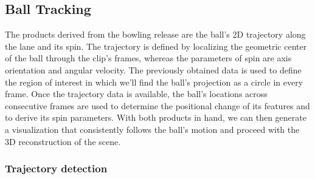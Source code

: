 \subsection{Ball Tracking}

The products derived from the bowling release are the ball’s 2D trajectory along the lane and its spin. The trajectory is defined by localizing the geometric center of the ball through the clip’s frames, whereas the parameters of spin are axis orientation and angular velocity. The previously obtained data is used to define the region of interest in which we’ll find the ball’s projection as a circle in every frame. Once the trajectory data is available, the ball’s locations across consecutive frames are used to determine the positional change of its features and to derive its spin parameters. With both products in hand, we can then generate a visualization that consistently follows the ball’s motion and proceed with the 3D reconstruction of the scene.

\subsubsection{Trajectory detection}

